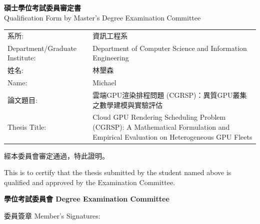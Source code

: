 \newpage
\thispagestyle{empty}

\begin{center}
\vspace*{0.5cm}
{\large \textbf{碩士學位考試委員審定書}}\\[0.3em]
{\normalsize Qualification Form by Master's Degree Examination Committee}
\end{center}

\vspace{0.8cm}

\noindent
\begin{tabular}{l>{\RaggedRight}p{8.7cm}}
系所: & 資訊工程系 \\
Department/Graduate Institute: & Department of Computer Science and Information Engineering \\[0.5em]
姓名: & 林墾森 \\
Name: & Michael \\[0.5em]
論文題目: & 雲端GPU渲染排程問題 (CGRSP)：異質GPU叢集之數學建模與實驗評估 \\
Thesis Title: & Cloud GPU Rendering Scheduling Problem (CGRSP): A Mathematical Formulation and Empirical Evaluation on Heterogeneous GPU Fleets \\
\end{tabular}

\vspace{0.8cm}

\noindent 經本委員會審定通過，特此證明。

\noindent This is to certify that the thesis submitted by the student named above is qualified and approved by the Examination Committee.

\vspace{0.8cm}

\noindent \textbf{學位考試委員會 \quad Degree Examination Committee}

\vspace{0.5cm}

\noindent 委員簽章 \quad Member's Signatures:

\vspace{0.3cm}
\noindent \underline{\hspace{6cm}} \hfill \underline{\hspace{6cm}}

\vspace{0.8cm}
\noindent \underline{\hspace{6cm}} \hfill \underline{\hspace{6cm}}

